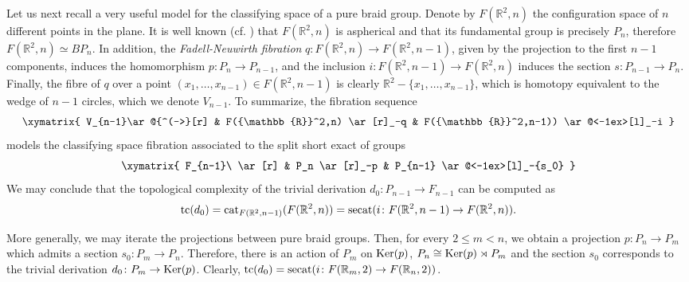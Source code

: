 \documentclass[11pt]{amsart}
\theoremstyle{plain}
\theoremstyle{definition}
\newcommand{\RR}{{\mathbb{R}}}
\newcommand{\Ker}{\mathop{\rm Ker}\nolimits}
\newcommand{\cat}{\mathop{\rm cat}\nolimits}
\newcommand{\secat}{\mathop{\rm secat}\nolimits}
\newcommand{\tc}{\mathop{\rm tc}\nolimits}
\begin{document}
Let us next recall a very useful model for the classifying space of a pure braid group. Denote by 
$F(\RR^2,n)$ the configuration space of $n$ different points in the plane. It is well known 
(cf. \cite[Sec. 1.4]{KasselTuraev2008}) that $F(\RR^2,n)$ is aspherical and that its fundamental group 
is precisely $P_n$, therefore $F(\RR^2,n)\simeq BP_n$. In addition, the \emph{Fadell-Neuwirth fibration}
$q\colon F(\RR^2,n)\to F(\RR^2,n-1)$, given by the projection to the first $n-1$ components, induces the
homomorphism $p\colon P_n\to P_{n-1}$, and the inclusion $i\colon F(\RR^2,n-1)\to F(\RR^2,n)$ induces 
the section $s\colon P_{n-1}\to P_n$. Finally, the fibre of $q$ over a point 
$(x_1,\ldots,x_{n-1})\in F(\RR^2,n-1)$ is clearly $\RR^2-\{x_1,\ldots,x_{n-1}\}$, which is homotopy 
equivalent to the wedge of $n-1$ circles, which we denote $V_{n-1}$. To summarize, 
the fibration sequence 
$$\xymatrix{
V_{n-1}\ar@{^(->}[r] & F(\RR^2,n) \ar[r]_-q &  F(\RR^2,n-1)) \ar@<-1ex>[l]_-i
}$$
models the classifying space fibration associated to the split short exact of groups
$$\xymatrix{
F_{n-1}\ \ar[r] & P_n \ar[r]_-p & P_{n-1} \ar@<-1ex>[l]_-{s_0}
}$$
We may conclude that the topological complexity of the trivial derivation $d_0\colon P_{n-1}\to F_{n-1}$ 
can be computed as
$$\tc(d_0)=\cat_{F(\RR^2,n-1)}(F(\RR^2,n))=\secat(i\colon F(\RR^2,n-1)\to F(\RR^2,n)).$$

More generally,  we may iterate the projections between pure braid groups. 
Then, for every $2\le m<n$, we obtain a projection $p\colon P_n\to P_m$ which admits a section
$s_0\colon P_m\to P_n$. Therefore, there is an action of $P_m$ on $\Ker(p)$, $P_n\cong \Ker(p)\rtimes P_m$ 
and the section $s_0$ corresponds to the trivial derivation $d_0\colon P_m\to\Ker(p)$.
Clearly, $\tc(d_0)=\secat(i\colon F(\RR_m,2)\to F(\RR_n,2))$.
\end{document}
